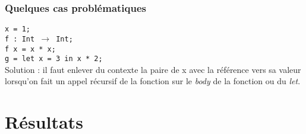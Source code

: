 \documentclass{beamer}
\begin{document}
\begin{frame}
    \frametitle{Quelques cas problématiques}
    \texttt{x = 1;} \\
    \bigskip
    \texttt{f : Int $\rightarrow$ Int;\\
    f x = x * x;}\\
    \bigskip
    \texttt{g = let x = 3 in x * 2;}\\
    \bigskip
    Solution : il faut enlever du contexte la paire de x avec la référence vers sa valeur lorsqu'on fait un appel récursif de la fonction sur le \emph{body} de la fonction ou du \emph{let}.
\end{frame}
\section{Résultats}
\end{document}

